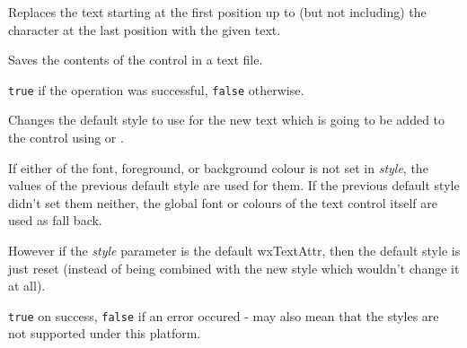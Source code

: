 
Replaces the text starting at the first position up to (but not including)
the character at the last position with the given text.






\label{wxtextctrlsavefile}


Saves the contents of the control in a text file.




{\tt true} if the operation was successful, {\tt false} otherwise.


\label{wxtextctrlsetdefaultstyle}


Changes the default style to use for the new text which is going to be added
to the control using  or\rtfsp
{}.

If either of the font, foreground, or background colour is not set in\rtfsp
{\it style}, the values of the previous default style are used for them. If
the previous default style didn't set them neither, the global font or colours
of the text control itself are used as fall back.

However if the {\it style} parameter is the default wxTextAttr, then the
default style is just reset (instead of being combined with the new style which
wouldn't change it at all).




{\tt true} on success, {\tt false} if an error occured - may also mean that
the styles are not supported under this platform.

